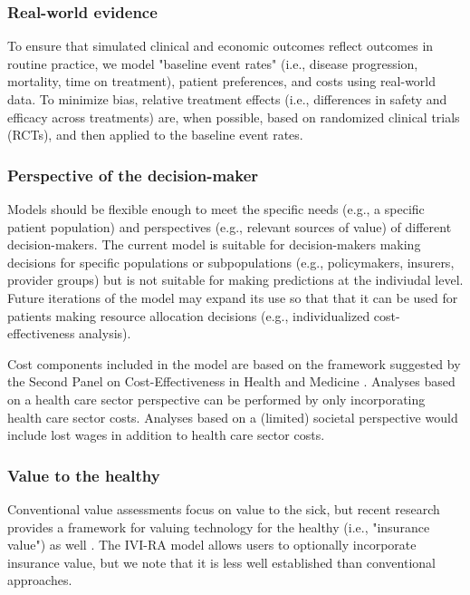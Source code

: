 \documentclass[11pt,final,fleqn]{article}
\theoremstyle{plain}
\begin{document}
\subsubsection*{Real-world evidence}
To ensure that simulated clinical and economic outcomes reflect outcomes in routine practice, we model "baseline event rates" (i.e., disease progression, mortality, time on treatment), patient preferences, and costs using real-world data. To minimize bias, relative treatment effects (i.e., differences in safety and efficacy across treatments) are, when possible, based on randomized clinical trials (RCTs), and then applied to the baseline event rates.

\subsubsection*{Perspective of the decision-maker}
Models should be flexible enough to meet the specific needs (e.g., a specific patient population) and perspectives (e.g., relevant sources of value) of different decision-makers. The current model is suitable for decision-makers making decisions for specific populations or subpopulations (e.g., policymakers, insurers, provider groups) but is not suitable for making predictions at the indiviudal level. Future iterations of the model may expand its use so that that it can be used for patients making resource allocation decisions (e.g., individualized cost-effectiveness analysis). 

Cost components included in the model are based on the framework suggested by the Second Panel on Cost-Effectiveness in Health and Medicine \citep{sanders2016recommendations}. Analyses based on a health care sector perspective can be performed by only incorporating health care sector costs. Analyses based on a (limited) societal perspective would include lost wages in addition to health care sector costs. 

\subsubsection*{Value to the healthy}
Conventional value assessments focus on value to the sick, but recent research provides a framework for valuing technology for the healthy (i.e., "insurance value") as well \citet{lakdawalla2017insurance}. The IVI-RA model allows users to optionally incorporate insurance value, but we note that it is less well established than conventional approaches. 
\end{document}
